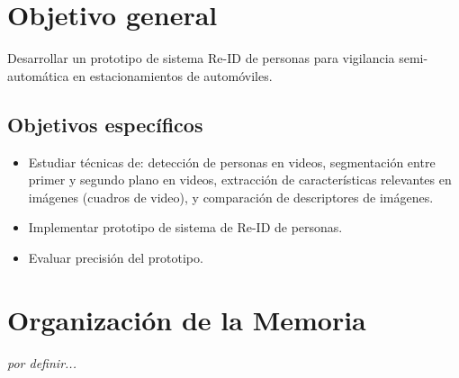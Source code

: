 \documentclass[../memoria.tex]{subfiles}
\begin{document}


\section{Objetivo general}
Desarrollar un prototipo de sistema Re-ID de personas para vigilancia semi-automática en estacionamientos de automóviles.
\subsection{Objetivos específicos}
\begin{itemize}
\item Estudiar técnicas de: detección de personas en videos, segmentación entre primer y segundo plano en videos, extracción de características relevantes en imágenes (cuadros de video), y comparación de descriptores de imágenes.
\item Implementar prototipo de sistema de Re-ID de personas.
\item Evaluar precisión del prototipo.
\end{itemize}

\section{Organización de la Memoria}
\emph{por definir...}
\end{document}
